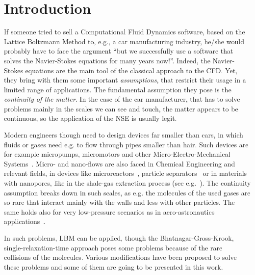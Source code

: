 \section{Introduction}
If someone tried to sell a Computational Fluid Dynamics software, based on
the Lattice Boltzmann Method to, e.g., a car manufacturing industry, he/she 
would probably have to face the argument ``but we successfully use a
software that solves the Navier-Stokes equations for many years now!''.
Indeed, the Navier-Stokes equations are the main tool of the classical approach
to the CFD. Yet, they bring with them some important \textit{assumptions}, that restrict
their usage in a limited range of applications. The fundamental assumption they
pose is the \textit{continuity of the matter}. In the case of the car manufacturer,
that has to solve problems mainly in the scales we can see and touch, the matter
appears to be continuous, so the application of the NSE is usually legit. 

Modern engineers though need to design devices far smaller than cars, in which
fluids or gases need e.g. to flow through pipes smaller than hair. Such devices
are for example micropumps, micromotors and other Micro-Electro-Mechanical 
Systems~\cite{Karniadakis_Microflows}. Micro- and nano-flows are also faced 
in Chemical Engineering and relevant fields, in devices like microreactors~\cite{Neumann2012},
particle separators~\cite{Karniadakis_Microflows} or in materials with nanopores, 
like in the shale-gas extraction process (see e.g.~\cite{Ren2015, Zhang2015}). 
The continuity assumption breaks down in
such scales, as e.g. the molecules of the used gases are so rare that interact
mainly with the walls and less with other particles. The same holds also for
very low-pressure scenarios as in aero-astronautics applications~\cite{Toschi2005}.

In such problems, LBM can be applied, though the Bhatnagar-Gross-Krook, single-relaxation-time approach
poses some problems because of the rare collisions of the molecules. Various
modifications have been proposed to solve these problems and some of them are 
going to be presented in this work.